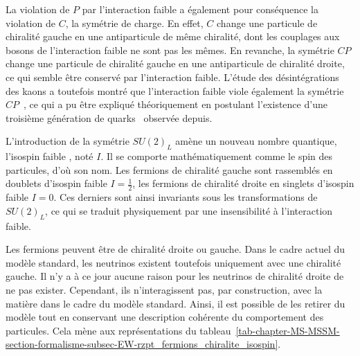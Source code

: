 \par La violation de $P$ par l'interaction faible a également pour conséquence la violation de $C$, la symétrie de charge.
En effet, $C$ change une particule de chiralité gauche en une antiparticule de même chiralité, dont les couplages aux bosons de l'interaction faible ne sont pas les mêmes.
En revanche, la symétrie $CP$ change une particule de chiralité gauche en une antiparticule de chiralité droite, ce qui semble être conservé par l'interaction faible.
L'étude des désintégrations des kaons a toutefois montré que l'interaction faible viole également la symétrie $CP$~\cite{Fitch_Cronin_CP_violation}, ce qui a pu être expliqué théoriquement en postulant l'existence d'une troisième génération de quarks~\cite{CKM_KM} observée depuis.
\par L'introduction de la symétrie $SU(2)_L$ amène un nouveau nombre quantique, l'\og isospin faible \fg, noté $I$. Il se comporte mathématiquement comme le spin des particules, d'où son nom. %
Les fermions de chiralité gauche sont rassemblés en doublets d'isospin faible $I=\frac{1}{2}$, les fermions de chiralité droite en singlets d'isospin faible $I=0$. Ces derniers sont ainsi invariants sous les transformations de $SU(2)_L$, ce qui se traduit physiquement par une insensibilité à l'interaction faible.
\par
Les fermions peuvent être de chiralité droite ou gauche.
Dans le cadre actuel du modèle standard, les neutrinos existent toutefois uniquement avec une chiralité gauche.
Il n'y a à ce jour aucune raison pour les neutrinos de chiralité droite de ne pas exister.
Cependant, ils n'interagissent pas, par construction, avec la matière dans le cadre du modèle standard.
Ainsi, il est possible de les retirer du modèle tout en conservant une description cohérente du comportement des particules.
Cela mène aux représentations du tableau~\ref{tab-chapter-MS-MSSM-section-formalisme-subsec-EW-rzpt_fermions_chiralite_isospin}.

